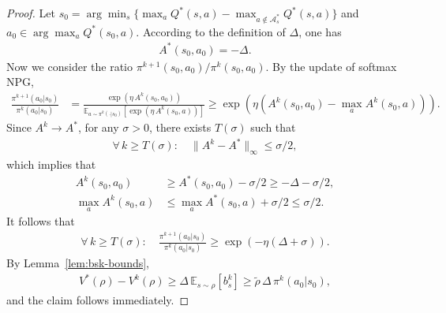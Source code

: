 \begin{proof}
    Let $s_0=\arg\min_{s}\{\max_a Q^*(s,a)-\max_{a\not\in\mathcal{A}_s^*}Q^*(s,a)\}$ and $a_0\in \arg\max_{a}Q^*(s_0,a)$. According to the definition of $\Delta$, one has 
\begin{align*}
A^*(s_0,a_0)=-\Delta.
\end{align*}
Now we consider the ratio $\pi^{k+1}(s_0,a_0)/\pi^k(s_0,a_0)$. By the update of softmax NPG,
\begin{align*}
\frac{\pi^{k+1}(a_0|s_0)}{\pi^k(a_0|s_0)}&=\frac{\exp(\eta\, A^k(s_0,a_0))}{\mathbb{E}_{a\sim\pi^k(\cdot|s_0)}\left[\exp(\eta\,A^k(s_0,a))\right]}\geq \exp\left(\eta\left(A^k(s_0,a_0)-\max_aA^k(s_0,a)\right)\right).
\end{align*}
Since $A^k\rightarrow A^*$, for any $\sigma>0$, there exists $T(\sigma)$ such that
\begin{align*}
\forall\,k\geq T(\sigma):\quad \|A^k-A^*\|_\infty\leq \sigma/2,
\end{align*}
which implies that 
\begin{align*}
A^k(s_0,a_0)&\geq A^*(s_0,a_0)-\sigma/2\geq -\Delta-\sigma/2,\\
\max_a A^k(s_0,a)&\leq\max_a A^*(s_0,a)+\sigma/2\leq \sigma/2. 
\end{align*}
It follows that 
\begin{align*}
\forall\,k\geq T(\sigma):\quad \frac{\pi^{k+1}(a_0|s_0)}{\pi^k(a_0|s_0)}\geq \exp\left( -\eta\left(\Delta+\sigma\right)\right).
\end{align*}
By Lemma~\ref{lem:bsk-bounds},
\begin{align*}
V^*(\rho)-V^k(\rho)\geq \Delta\,\mathbb{E}_{s\sim \rho}\left[b_s^k\right]\geq \tilde{\rho}\,\Delta\,\pi^k(a_0|s_0),
\end{align*}
and the  claim follows immediately. 
\end{proof}